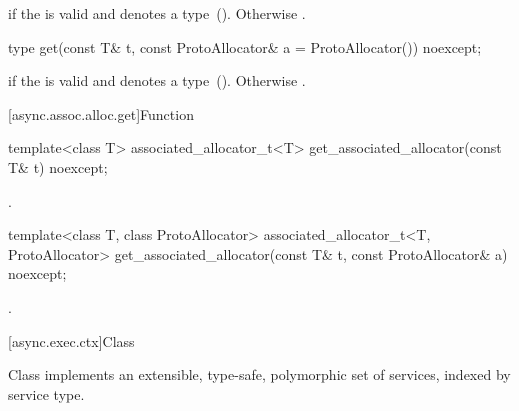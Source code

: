 \begin{itemdescr}
\pnum
\ctype {} if the  
is valid and denotes a type~().
Otherwise .
\end{itemdescr}

\begin{itemdecl}
type get(const T& t, const ProtoAllocator& a = ProtoAllocator()) noexcept;
\end{itemdecl}

\begin{itemdescr}
\pnum
\returns {} if the  
is valid and denotes a type~().
Otherwise .
\end{itemdescr}



[async.assoc.alloc.get]{Function }

%
\begin{itemdecl}
template<class T>
  associated_allocator_t<T> get_associated_allocator(const T& t) noexcept;
\end{itemdecl}

\begin{itemdescr}
\pnum
\returns {}.
\end{itemdescr}

\begin{itemdecl}
template<class T, class ProtoAllocator>
  associated_allocator_t<T, ProtoAllocator>
    get_associated_allocator(const T& t, const ProtoAllocator& a) noexcept;
\end{itemdecl}

\begin{itemdescr}
\pnum
\returns {}.
\end{itemdescr}



[async.exec.ctx]{Class }

%
\pnum
Class  implements an extensible, type-safe, polymorphic set of services, indexed by service type.

